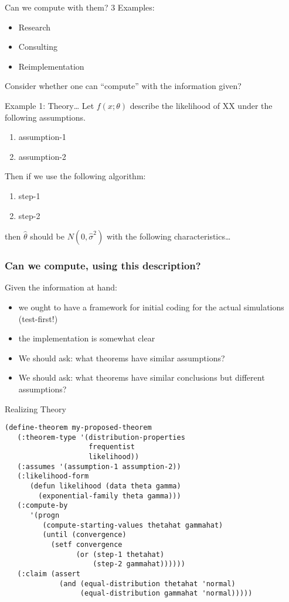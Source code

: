 \documentclass{beamer}
\begin{document}
\begin{frame}{Can we compute with them?}
  3 Examples:
  \begin{itemize}
  \item Research
  \item Consulting
  \item Reimplementation
  \end{itemize}
  Consider whether one can ``compute'' with the information given?
\end{frame}

\begin{frame}[fragile]{Example 1: Theory\ldots}
  \label{example1}
  Let $f(x;\theta)$ describe the likelihood of XX under the following
  assumptions.  
  \begin{enumerate}
  \item assumption-1
  \item assumption-2
  \end{enumerate}
  Then if we use the following algorithm:
  \begin{enumerate}
  \item step-1
  \item step-2
  \end{enumerate}
  then $\hat{\theta}$ should be $N(0,\hat\sigma^2)$ with the following
  characteristics\ldots
\end{frame}

\begin{frame}
  \frametitle{Can we compute, using this description?}
  Given the information at hand:
  \begin{itemize}
  \item we ought to have a framework for initial coding for the
    actual simulations (test-first!)
  \item the implementation is somewhat clear
  \item We should ask: what theorems have similar assumptions?
  \item We should ask: what theorems have similar conclusions but
    different assumptions?
  \end{itemize}
\end{frame}

\begin{frame}[fragile]{Realizing Theory}
  \small{
\begin{verbatim}  
(define-theorem my-proposed-theorem
   (:theorem-type '(distribution-properties
                    frequentist
                    likelihood))
   (:assumes '(assumption-1 assumption-2))
   (:likelihood-form
      (defun likelihood (data theta gamma)
        (exponential-family theta gamma)))
   (:compute-by
      '(progn
         (compute-starting-values thetahat gammahat)
         (until (convergence)
           (setf convergence
                 (or (step-1 thetahat)
                     (step-2 gammahat))))))
   (:claim (assert 
             (and (equal-distribution thetahat 'normal)
                  (equal-distribution gammahat 'normal)))))
\end{verbatim}
  }
\end{frame}
\end{document}
